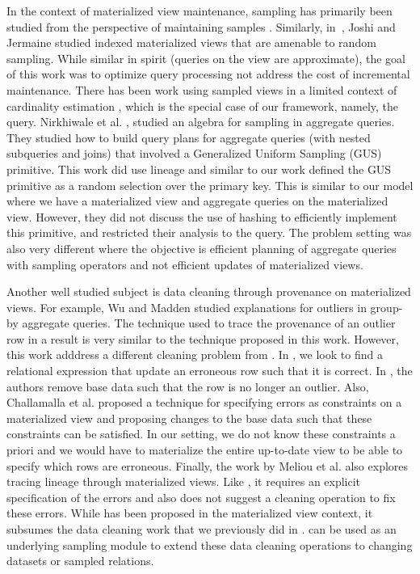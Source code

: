 In the context of materialized view maintenance, sampling has primarily been studied from the perspective of maintaining samples \cite{DBLP:conf/icde/OlkenR92}.
Similarly, in~\cite{joshi2008materialized}, Joshi and Jermaine studied indexed materialized views that are amenable to random sampling.
While similar in spirit (queries on the view are approximate), the goal of this work was to optimize query processing not address the cost of incremental maintenance.
There has been work using sampled views in a limited context of cardinality estimation \cite{larson2007cardinality}, which is the special case of our framework, namely, the \countfunc query.
Nirkhiwale et al. \cite{DBLP:journals/pvldb/NirkhiwaleDJ13}, studied an algebra for sampling in aggregate queries.
They studied how to build query plans for aggregate queries (with nested subqueries and joins) that involved a Generalized Uniform Sampling (GUS) primitive.
This work did use lineage and similar to our work defined the GUS primitive as a random selection over the primary key.
This is similar to our model where we have a materialized view and aggregate queries on the materialized view.
However, they did not discuss the use of hashing to efficiently implement this primitive, and restricted their analysis to the \sumfunc query.
The problem setting was also very different where the objective is efficient planning of aggregate queries with sampling operators and not efficient updates of materialized views.

Another well studied subject is data cleaning through provenance on materialized views.
For example, Wu and Madden \cite{DBLP:journals/pvldb/0002M13} studied explanations for outliers in group-by aggregate queries.
The technique used to trace the provenance of an outlier row in a result is very similar to the technique proposed in this work.
However, this work adddress a different cleaning problem from \svc.
In \svc, we look to find a relational expression that update an erroneous row such that it is correct.
In \cite{DBLP:journals/pvldb/0002M13}, the authors remove base data such that the row is no longer an outlier.
Also, Challamalla et al. \cite{DBLP:conf/sigmod/ChalamallaIOP14} proposed a technique for specifying errors as constraints on a materialized view and proposing changes to the base data such that these constraints can be satisfied.
In our setting, we do not know these constraints a priori and we would have to materialize the entire up-to-date view to be able to specify which rows are erroneous.
Finally, the work by Meliou et al. \cite{DBLP:conf/sigmod/MeliouGNS11} also explores tracing lineage through materialized views. 
Like \cite{DBLP:journals/pvldb/0002M13, DBLP:journals/pvldb/0002M13}, it requires an explicit specification of the errors and also does not suggest a cleaning operation to fix these errors.
While \svc has been proposed in the materialized view context, it subsumes the data cleaning work that we previously did in \cite{wang1999sample}.
\svc can be used as an underlying sampling module to extend these data cleaning operations to changing datasets or sampled relations.

